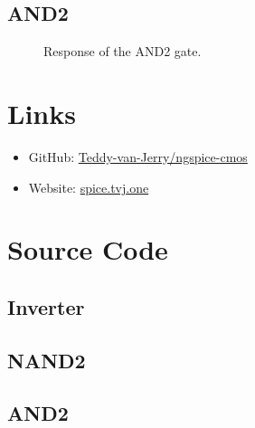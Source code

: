 \documentclass{scrartcl}
\begin{document}
    \subsection{AND2}

      \begin{figure}[htbp]
        \sffamily
        \caption{Response of the AND2 gate.}
      \end{figure}

  \appendix

  \section{Links}
    \begin{itemize}
      \item GitHub: \href{https://github.com/Teddy-van-Jerry/ngspice-cmos}{Teddy-van-Jerry/ngspice-cmos}
      \item Website: \href{https://spice.tvj.one}{spice.tvj.one}
    \end{itemize}

  \section{Source Code}

    \subsection{Inverter}
      
      

    \subsection{NAND2}
      
      

    \subsection{AND2}
      
      
\end{document}
